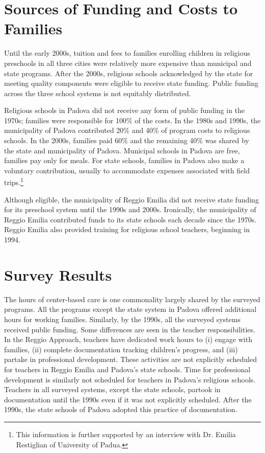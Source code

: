 \documentclass[12pt]{article}
\begin{document}
\section{Sources of Funding and Costs to Families }
Until the early 2000s, tuition and fees to families enrolling children in religious preschools in all three cities were relatively more expensive than municipal and state programs. After the 2000s, religious schools acknowledged by the state for meeting quality components were eligible to receive state funding. Public funding across the three school systems is not equitably distributed. 

Religious schools in Padova did not receive any form of public funding in the 1970s; families were responsible for 100\% of the costs. In the 1980s and 1990s, the municipality of Padova contributed 20\% and 40\% of program costs to religious schools. In the 2000s, families paid 60\% and the remaining 40\% was shared by the state and municipality of Padova. Municipal schools in Padova are free, families pay only for meals. For state schools, families in Padova also make a voluntary contribution, usually to accommodate expenses associated with field trips.\footnote{This information is further supported by an interview with Dr. Emilia Restiglian of University of Padua.}  
 
Although eligible, the municipality of Reggio Emilia did not receive state funding for its preschool system until the 1990s and 2000s. Ironically, the municipality of Reggio Emilia contributed funds to its state schools each decade since the 1970s. Reggio Emilia also provided training for religious school teachers, beginning in 1994.  

 \section{Survey Results}
 
The hours of center-based care is one commonality largely shared by the surveyed programs. All the programs except the state system in Padova offered additional hours for working families. Similarly, by the 1990s, all the surveyed systems received public funding. Some differences are seen in the teacher responsibilities. In the Reggio Approach, teachers have dedicated work hours to (i) engage with families, (ii) complete documentation tracking children's progress, and (iii) partake in professional development. These activities are not explicitly scheduled for teachers in Reggio Emilia and Padova's state schools. Time for professional development is similarly not scheduled for teachers in Padova's religious schools. Teachers in all surveyed systems, except the state schools, partook in documentation until the 1990s even if it was not explicitly scheduled. After the 1990s, the state schools of Padova adopted this practice of documentation.
\end{document}
